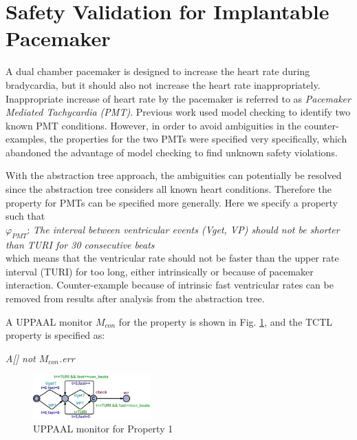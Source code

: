 \section{Safety Validation for Implantable Pacemaker}
A dual chamber pacemaker is designed to increase the heart rate during bradycardia, but it should also not increase the heart rate inappropriately.
Inappropriate increase of heart rate by the pacemaker is referred to as \emph{Pacemaker Mediated Tachycardia (PMT)}.
Previous work \cite{STTT13} used model checking to identify two known PMT conditions.
However, in order to avoid ambiguities in the counter-examples, the properties for the two PMTs were specified very specifically, which abandoned the advantage of model checking to find unknown safety violations.

With the abstraction tree approach, the ambiguities can potentially be resolved since the abstraction tree considers all known heart conditions.
Therefore the property for PMTs can be specified more generally.
Here we specify a property such that\\
$\varphi_{PMT}$: \emph{The interval between ventricular events (Vget, VP) should not be shorter than TURI for 30 consecutive beats}\\
which means that the ventricular rate should not be faster than the upper rate interval (TURI) for too long, either intrinsically or because of pacemaker interaction.
Counter-example because of intrinsic fast ventricular rates can be removed from results after analysis from the abstraction tree.

A UPPAAL monitor $M_{con}$ for the property is shown in Fig. \ref{fig:monitor}, and the TCTL property is specified as:\\
\begin{center}
\emph{A[] not $M_{con}$.err}
\end{center}

\begin{figure}[!t]
	\centering
	\includegraphics[width=0.4\textwidth]{figs/monitor.png}
	\caption{\small UPPAAL monitor for Property 1}
	\label{fig:monitor}
\end{figure}

